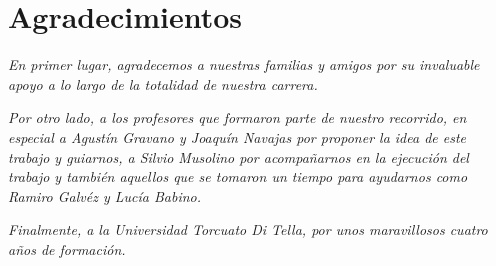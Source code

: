 %
\chapter{Agradecimientos}
\label{sec::agradecimientos}

\textit{En primer lugar, agradecemos a nuestras familias y amigos por su invaluable apoyo a lo largo de la totalidad de nuestra carrera.}

\textit{Por otro lado, a los profesores que formaron parte de nuestro recorrido, en especial a Agustín Gravano y Joaquín Navajas por proponer la idea de este trabajo y guiarnos, a Silvio Musolino por acompañarnos en la ejecución del trabajo y también aquellos que se tomaron un tiempo para ayudarnos como Ramiro Galvéz y Lucía Babino.}

\textit{Finalmente, a la Universidad Torcuato Di Tella, por unos maravillosos cuatro años de formación.}





